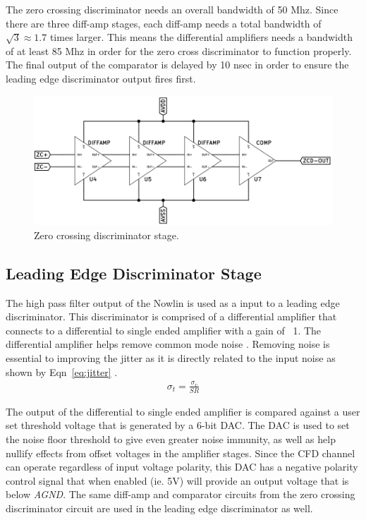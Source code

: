 \documentclass[12pt,oneside,final]{siuethesis}
\theoremstyle{definition}
\begin{document}
\par The zero crossing discriminator needs an overall bandwidth of 50 Mhz. Since there are three diff-amp stages, each diff-amp needs a total bandwidth of $\sqrt{3} \approx 1.7$  times larger. This means the differential amplifiers needs a bandwidth of at least 85 Mhz in order for the zero cross discriminator to function properly. The final output of the comparator is delayed by 10 nsec in order to ensure the leading edge discriminator output fires first.\newpage
\begin{figure}[ht]
\centering
\includegraphics[scale=.55,keepaspectratio=true]{images/zcd_circuit.png} 
\caption{Zero crossing discriminator stage.}
\label{fig:ZCD}
\end{figure}
\subsection{Leading Edge Discriminator Stage}
\par The high pass filter output of the Nowlin is used as a input to a leading edge discriminator. This discriminator is comprised of a differential amplifier that connects to a differential to single ended amplifier with a gain of ~1. The differential amplifier helps remove common mode noise \cite{COMMON_MODE}. Removing noise is essential to improving the jitter as it is directly related to the input noise  as shown by Eqn~\ref{eq:jitter} \cite{CFD}. 
\begin{eqnarray}
\sigma _t  = \frac{\sigma _v}{SR}
\label{eq:jitter}
\end{eqnarray}
\par The output of the differential to single ended amplifier is compared against a user set threshold voltage that is generated by a 6-bit DAC. The DAC is used to set the noise floor threshold to give even greater noise immunity, as well as help nullify effects from offset voltages in the amplifier stages. Since the CFD channel can operate regardless of input voltage polarity, this DAC has a negative polarity control signal that when enabled (ie. 5V) will provide an output voltage that is below \emph{AGND}. The same diff-amp and comparator circuits from the zero crossing discriminator circuit are used in the leading edge discriminator as well. 
\end{document}
